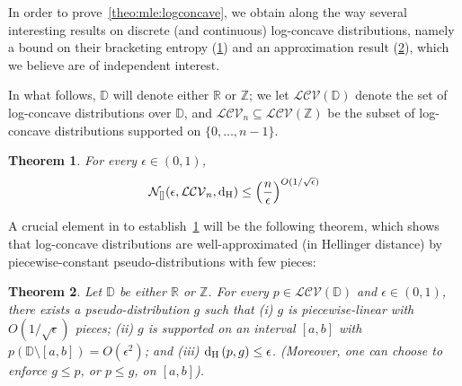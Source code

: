 \documentclass[11pt]{article}
\newtheorem{theorem}{Theorem}[section]
\theoremstyle{definition}
\newcommand{\R}{\mathbb{R}}
\newcommand{\Z}{\mathbb{Z}}
\newcommand{\eps}{\epsilon}
\newcommand{\bigO}[1]{{O\left( #1 \right)}}
\newcommand{\classlogconcave}{\ensuremath{\mathcal{LCV}}\xspace}
\newcommand{\bracketing}[3][\operatorname{d}_{\rm H}]{\mathcal{N}_{[ ]}(#2,#3,#1)}
\newcommand{\hellinger}[2]{{\operatorname{d_{\rm{}H}}\left({#1, #2}\right)}}
\begin{document}
In order to prove~\cref{theo:mle:logconcave}, we obtain along the way several interesting results on discrete (and continuous) log-concave distributions, namely a bound on their bracketing entropy (\cref{theo:bracketing:hellinger}) and an approximation result (\cref{theo:approx:hellinger}), which we believe are of independent interest.\medskip

In what follows, $\mathbb{D}$ will denote either $\R$ or $\Z$; we let $\classlogconcave(\mathbb{D})$ denote the set of log-concave distributions over $\mathbb{D}$, and $\classlogconcave_n\subseteq \classlogconcave(\Z)$ be the subset of log-concave distributions supported on $\{0,\dots,n-1\}$.
\begin{theorem}\label{theo:bracketing:hellinger}
  For every $\eps\in(0,1)$,
  \[
      \bracketing{\eps}{\classlogconcave_n} \leq \left(\frac{n}{\eps}\right)^{O(1/\sqrt{\eps})}
  \]  
\end{theorem}

A crucial element in to establish~\cref{theo:bracketing:hellinger} will be the following theorem, which shows that log-concave distributions are well-approximated (in Hellinger distance) by piecewise-constant pseudo-distributions with few pieces:
 \begin{theorem}\label{theo:approx:hellinger}
  Let $\mathbb{D}$ be either $\R$ or $\Z$. For every $p\in\classlogconcave(\mathbb{D})$ and $\eps\in(0,1)$, there exists a pseudo-distribution $g$ such that (i) $g$ is piecewise-linear with $\bigO{1/\sqrt{\eps}}$ pieces; (ii) $g$ is supported on an interval $[a,b]$ with $p(\mathbb{D}\setminus[a,b]) = O(\eps^2)$; and (iii) $\hellinger{p}{g}\leq \eps$. (Moreover, one can choose to enforce $g\leq p$, or $p\leq g$, on $[a,b]$).
\end{theorem}
\end{document}

